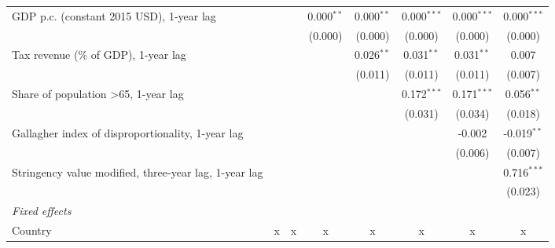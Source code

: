 \begin{table}[htbp]
\begin{tabular}{lccccccc}
      GDP p.c. (constant 2015 USD), 1-year lag                                &                &                & 0.000$^{**}$   & 0.000$^{**}$   & 0.000$^{***}$  & 0.000$^{***}$  & 0.000$^{***}$\\   
                                                                              &                &                & (0.000)        & (0.000)        & (0.000)        & (0.000)        & (0.000)\\   
      Tax revenue (\% of GDP), 1-year lag                                     &                &                &                & 0.026$^{**}$   & 0.031$^{**}$   & 0.031$^{**}$   & 0.007\\   
                                                                              &                &                &                & (0.011)        & (0.011)        & (0.011)        & (0.007)\\   
      Share of population >65, 1-year lag                                     &                &                &                &                & 0.172$^{***}$  & 0.171$^{***}$  & 0.056$^{**}$\\   
                                                                              &                &                &                &                & (0.031)        & (0.034)        & (0.018)\\   
      Gallagher index of disproportionality, 1-year lag                       &                &                &                &                &                & -0.002         & -0.019$^{**}$\\   
                                                                              &                &                &                &                &                & (0.006)        & (0.007)\\   
      Stringency value modified, three-year lag, 1-year lag                   &                &                &                &                &                &                & 0.716$^{***}$\\   
                                                                              &                &                &                &                &                &                & (0.023)\\   
      \emph{Fixed effects}\\
      Country                                                                 & x              & x              & x              & x              & x              & x              & x\\  

\end{tabular}
\end{table}
